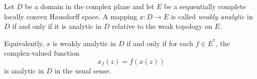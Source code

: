 Let $D$ be a domain in the complex plane and let $E$ be a sequentially complete locally convex Hausdorff space. A mapping $x : D \to E$ is called \textit{weakly analytic} in $D$ if and only if it is analytic in $D$ relative to the weak topology on $E$.

Equivalently, $x$ is weakly analytic in $D$ if and only if for each $f \in E^*$, the complex-valued function
$$x_f(z) = f(x(z))$$
is analytic in $D$ in the usual sense.
